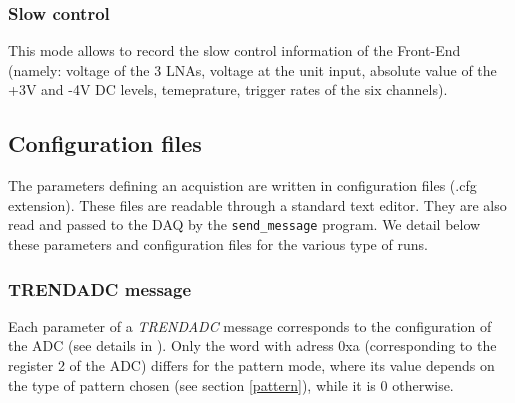 \subsubsection{Slow control}
This mode allows to record the slow control information of the Front-End (namely: voltage of the 3 LNAs, voltage at the unit input, absolute value of the +3V and -4V DC levels, temeprature, trigger rates of the six channels). 

\subsection{Configuration files}
\label{config}
The parameters defining an acquistion are written in configuration files (.cfg extension). These files are readable through a standard text editor. They are also read and passed to the DAQ by the \texttt{send\_message} program.
We detail below these parameters and configuration files for the various type of runs. 
%
\subsubsection{TRENDADC message}
Each parameter of a {\it TRENDADC} message corresponds to the configuration of the ADC (see details in \cite{ADCdoc}). Only the word with adress 0xa (corresponding to the register 2 of the ADC) differs for the pattern mode, where its value depends on the type of pattern chosen (see section \ref{pattern}), while it is 0 otherwise. 
%
